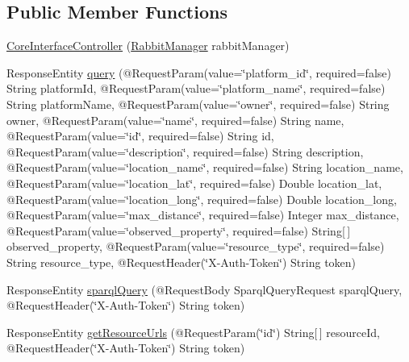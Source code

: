 \subsection*{Public Member Functions}
\begin{DoxyCompactItemize}
\item 
\hyperlink{classeu_1_1h2020_1_1symbiote_1_1controllers_1_1CoreInterfaceController_a58b26a72b6964d21f04c7f680640dcce}{Core\+Interface\+Controller} (\hyperlink{classeu_1_1h2020_1_1symbiote_1_1communication_1_1RabbitManager}{Rabbit\+Manager} rabbit\+Manager)
\item 
Response\+Entity \hyperlink{classeu_1_1h2020_1_1symbiote_1_1controllers_1_1CoreInterfaceController_aa3f7d2db7a96024ca0cefdef1dbe13fa}{query} (@Request\+Param(value=\char`\"{}platform\+\_\+id\char`\"{}, required=false) String platform\+Id, @Request\+Param(value=\char`\"{}platform\+\_\+name\char`\"{}, required=false) String platform\+Name, @Request\+Param(value=\char`\"{}owner\char`\"{}, required=false) String owner, @Request\+Param(value=\char`\"{}name\char`\"{}, required=false) String name, @Request\+Param(value=\char`\"{}id\char`\"{}, required=false) String id, @Request\+Param(value=\char`\"{}description\char`\"{}, required=false) String description, @Request\+Param(value=\char`\"{}location\+\_\+name\char`\"{}, required=false) String location\+\_\+name, @Request\+Param(value=\char`\"{}location\+\_\+lat\char`\"{}, required=false) Double location\+\_\+lat, @Request\+Param(value=\char`\"{}location\+\_\+long\char`\"{}, required=false) Double location\+\_\+long, @Request\+Param(value=\char`\"{}max\+\_\+distance\char`\"{}, required=false) Integer max\+\_\+distance, @Request\+Param(value=\char`\"{}observed\+\_\+property\char`\"{}, required=false) String\mbox{[}$\,$\mbox{]} observed\+\_\+property, @Request\+Param(value=\char`\"{}resource\+\_\+type\char`\"{}, required=false) String resource\+\_\+type, @Request\+Header(\char`\"{}X-\/Auth-\/Token\char`\"{}) String token)
\item 
Response\+Entity \hyperlink{classeu_1_1h2020_1_1symbiote_1_1controllers_1_1CoreInterfaceController_a7ee735ef5179a5877209ae270e7f8465}{sparql\+Query} (@Request\+Body Sparql\+Query\+Request sparql\+Query, @Request\+Header(\char`\"{}X-\/Auth-\/Token\char`\"{}) String token)
\item 
Response\+Entity \hyperlink{classeu_1_1h2020_1_1symbiote_1_1controllers_1_1CoreInterfaceController_a77926783c29213efb03dee68ca69f3d4}{get\+Resource\+Urls} (@Request\+Param(\char`\"{}id\char`\"{}) String\mbox{[}$\,$\mbox{]} resource\+Id, @Request\+Header(\char`\"{}X-\/Auth-\/Token\char`\"{}) String token)

\end{DoxyCompactItemize}
